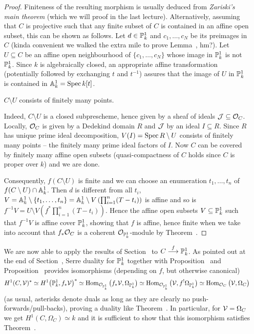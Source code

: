 \documentclass[a4paper,parskip=half,numbers=enddot, DIV=12]{scrreprt}
\begin{document}
\begin{proof}
	Finiteness of the resulting morphism is usually deduced from \emph{Zariski's main theorem} (which we will proof in the last lecture). Alternatively, assuming that $C$ is projective such that any finite subset of $C$ is contained in an affine open subset, this can be shown as follows. Let $d\in\mathbb{P}_k^1$ and $c_1,\ldots,c_N$ be its preimages in $C$ (kinda convenient we walked the extra mile to prove Lemma~, hm?). Let $U\subseteq C$ be an affine open neighbourhood of $\{c_1,\ldots,c_N\}$ whose image in $\mathbb{P}_k^1$ is not $\mathbb{P}_k^1$. Since $k$ is algebraically closed, an appropriate affine transformation (potentially followed by exchanging $t$ and $t^{-1}$) assures that the image of $U$ in $\mathbb{P}_k^1$ is contained in $\mathbb{A}_k^1=\operatorname{Spec} k[t]$. 
	\begin{claim}
		$C\setminus U$ consists of finitely many points.
	\end{claim}
	Indeed, $C\setminus U$ is a closed subprescheme, hence given by a sheaf of ideals $\mathcal{J}\subseteq \mathcal{O}_C$. Locally, $\mathcal{O}_C$ is given by a Dedekind domain $R$ and $\mathcal{J}$ by an ideal $I\subseteq R$. Since $R$ has unique prime ideal decomposition, $V(I)=\operatorname{Spec} R\setminus U$ consists of finitely many points -- the finitely many prime ideal factors of $I$. Now $C$ can be covered by finitely many affine open subsets (quasi-compactness of $C$ holds since $C$ is proper over $k$) and we are done.
	
	Consequently, $f(C\setminus U)$ is finite and we can choose an enumeration $t_1,\ldots,t_n$ of $f(C\setminus U)\cap \mathbb{A}_k^1$. Then $d$ is different from all $t_i$, $V=\mathbb{A}_k^1\setminus\{t_1,\ldots,t_n\}=\mathbb{A}_k^1\setminus V\left(\prod_{i=1}^n(T-t_i)\right)$ is affine and so is $f^{-1}V=U\setminus V\left(f^*\prod_{i=1}^n(T-t_i)\right)$. Hence the affine open subsets $V\subseteq \mathbb{P}_k^1$ such that $f^{-1}V$ is affine cover $\mathbb{P}_k^1$, showing that $f$ is affine, hence finite when we take into account that $f_*\mathcal{O}_C$ is a coherent $\mathcal{O}_{\mathbb{P}_k^1}$-module by Theorem~.
\end{proof}
We are now able to apply the results of Section~ to $C\morphism[f]\IP_k^1$.
As pointed out at the end of Section~, Serre duality for $\mathbb{P}_k^1$ together with Proposition~ and Proposition~ provides isomorphisms (depending on $f$, but otherwise canonical)
\begin{align*}
	H^1(C,\mathcal{V})^*\simeq H^1\big(\mathbb{P}_k^1,f_*\mathcal{V}\big)^*\simeq \operatorname{Hom}_{\mathcal{O}_{\mathbb{P}_k^1}}\big(f_*\mathcal{V},\Omega_{\mathbb{P}_k^1}\big)\simeq \operatorname{Hom}_{\mathcal{O}_{\mathbb{P}_k^1}}\big(\mathcal{V},f^!\Omega_{\mathbb{P}_k^1}\big)\simeq \operatorname{Hom}_{\mathcal{O}_C}\big(\mathcal{V},\Omega_C\big)
\end{align*}
(as usual, asterisks denote duals as long as they are clearly no push-forwards/pull-backs), proving a duality like Theorem~. In particular, for $\mathcal{V}=\Omega_C$ we get $H^1(C,\Omega_C)\simeq k$ and it is sufficient to show that this isomorphism satisfies Theorem~. 
\end{document}

